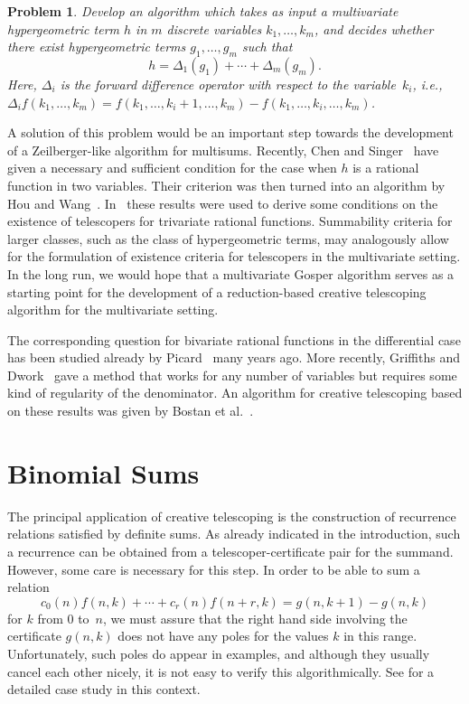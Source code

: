 \documentclass[a4paper,draft]{amsart}
\newtheorem{problem}{Problem}
\begin{document}
 \begin{problem}
   Develop an algorithm which takes as input a multivariate hypergeometric term
   $h$ in $m$ discrete variables $k_1,\dots,k_m$, and decides whether there exist
   hypergeometric terms $g_1,\dots,g_m$ such that
   \[
     h = \Delta_1(g_1) + \cdots + \Delta_m(g_m).
   \]
   Here, $\Delta_i$ is the forward difference operator with respect to
   the variable~$k_i$, i.e., $\Delta_i
   f(k_1,\dots,k_m)=f(k_1,\dots,k_i+1,\dots,k_m)-f(k_1,\dots,k_i,\dots,k_m)$.
 \end{problem}

 A solution of this problem would be an important step towards the development
 of a Zeilberger-like algorithm for multisums. Recently, Chen and
 Singer~\cite{chen12d,chen14b} have given a necessary and sufficient condition
 for the case when $h$ is a rational function in two variables. Their criterion
 was then turned into an algorithm by Hou and Wang~\cite{hou15}.
 In~\cite{chen16} these results were used to derive some conditions on the
 existence of telescopers for trivariate rational functions. Summability
 criteria for larger classes, such as the class of hypergeometric terms, may
 analogously allow for the formulation of existence criteria for telescopers in
 the multivariate setting. In the long run, we would hope that a multivariate Gosper algorithm
 serves as a starting point for the development of a reduction-based
 creative telescoping algorithm for the multivariate setting.

 The corresponding question for bivariate rational functions in the differential
 case has been studied already by Picard~\cite{picard06,picard33} many years
 ago. More recently, Griffiths and Dwork~\cite{dwork62,dwork64,griffiths69,griffiths69a} gave a method
 that works for any number of variables but requires some kind of regularity of the denominator. An
 algorithm for creative telescoping based on these results was given by Bostan
 et al.~\cite{bostan13b}.

 \section{Binomial Sums}

 The principal application of creative telescoping is the construction of
 recurrence relations satisfied by definite sums. As already indicated in the introduction,
 such a recurrence can be obtained from a telescoper-certificate pair for the summand.
 However, some care is necessary for this step. In order to be able to sum a relation
 \[
   c_0(n)f(n,k)+\cdots+c_r(n)f(n+r,k) = g(n,k+1)-g(n,k)
 \]
 for $k$ from $0$ to~$n$, we must assure that the right hand side involving the certificate
 $g(n,k)$ does not have any poles for the values $k$ in this range. Unfortunately, such
 poles do appear in examples, and although they usually cancel each other nicely, it is not
 easy to verify this algorithmically. See \cite{chyzak14a} for a detailed case study in
 this context.
\end{document}
